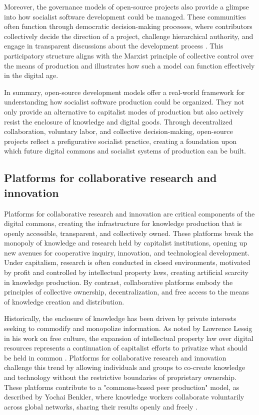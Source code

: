 \begin{refsection}
Moreover, the governance models of open-source projects also provide a glimpse into how socialist software development could be managed. These communities often function through democratic decision-making processes, where contributors collectively decide the direction of a project, challenge hierarchical authority, and engage in transparent discussions about the development process \cite[pp.~111-112]{ostrom1990}. This participatory structure aligns with the Marxist principle of collective control over the means of production and illustrates how such a model can function effectively in the digital age.

In summary, open-source development models offer a real-world framework for understanding how socialist software production could be organized. They not only provide an alternative to capitalist modes of production but also actively resist the enclosure of knowledge and digital goods. Through decentralized collaboration, voluntary labor, and collective decision-making, open-source projects reflect a prefigurative socialist practice, creating a foundation upon which future digital commons and socialist systems of production can be built.

\subsection{Platforms for collaborative research and innovation}

Platforms for collaborative research and innovation are critical components of the digital commons, creating the infrastructure for knowledge production that is openly accessible, transparent, and collectively owned. These platforms break the monopoly of knowledge and research held by capitalist institutions, opening up new avenues for cooperative inquiry, innovation, and technological development. Under capitalism, research is often conducted in closed environments, motivated by profit and controlled by intellectual property laws, creating artificial scarcity in knowledge production. By contrast, collaborative platforms embody the principles of collective ownership, decentralization, and free access to the means of knowledge creation and distribution.

Historically, the enclosure of knowledge has been driven by private interests seeking to commodify and monopolize information. As noted by Lawrence Lessig in his work on free culture, the expansion of intellectual property law over digital resources represents a continuation of capitalist efforts to privatize what should be held in common \cite[pp.~89-91]{lessig2004}. Platforms for collaborative research and innovation challenge this trend by allowing individuals and groups to co-create knowledge and technology without the restrictive boundaries of proprietary ownership. These platforms contribute to a "commons-based peer production" model, as described by Yochai Benkler, where knowledge workers collaborate voluntarily across global networks, sharing their results openly and freely \cite[pp.~34-36]{benkler2010}.


\end{refsection}
